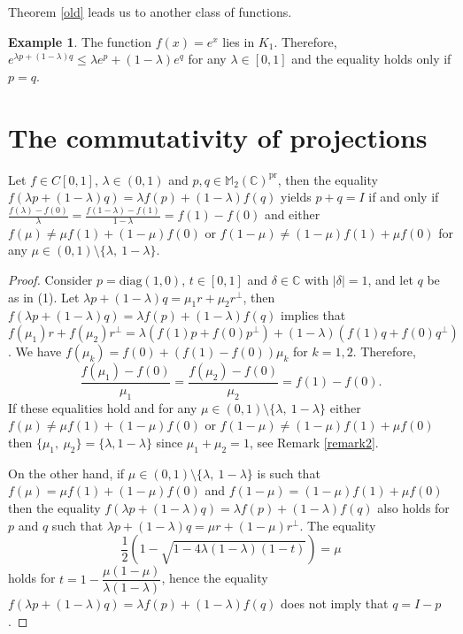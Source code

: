 \documentclass[
11pt,%
tightenlines,%
twoside,%
onecolumn,%
nofloats,%
nobibnotes,%
nofootinbib,%
superscriptaddress,%
noshowpacs,%
centertags]%
{revtex4}
\theoremstyle{definition}
\newtheorem{example}{Example} %
\begin{document}
Theorem \ref{old} leads us to another class of  functions.

\begin{example}
The function $f(x)=e^x$ lies in $K_1$.
  Therefore, $e^{\lambda p +(1-\lambda) q}\leq \lambda e^p +(1-\lambda) e^q$
for any $\lambda\in[0,1]$ and the equality holds only if $p=q$.
\end{example}

\section{The commutativity of projections}

\begin{lemma}\label{2dim2}
Let $f\in C[0,1]$, $\lambda\in (0,1)$ and $p, q\in
\mathbb{M}_2(\mathbb{C})^\mathrm{pr}$,  then the equality $f(\lambda
p +(1-\lambda) q)=\lambda f(p)+(1-\lambda)f(q)$ yields $p+q=I$ if
and only if
$\frac{f(\lambda)-f(0)}{\lambda}=\frac{f(1-\lambda)-f(1)}{1-\lambda}=f(1)-f(0)$
and either $f(\mu)\neq \mu f(1)+(1-\mu)f(0)$ or $f(1-\mu)\neq
(1-\mu) f(1)+\mu f(0)$ for any $\mu\in(0,1)\setminus\{\lambda,\
1-\lambda\}$.

\end{lemma}
\begin{proof}
Consider $p=\mathrm{diag}(1,0)$, $t\in [0,1]$ and $\delta\in
\mathbb{C}$  with $|\delta|=1$, and let $q$ be as in (1). Let
$\lambda p+(1-\lambda)q =\mu_1 r+\mu_2 r^\perp$, then $f(\lambda p
+(1-\lambda) q)=\lambda f(p)+(1-\lambda)f(q)$ implies that
$f(\mu_1)r+f(\mu_2)r^\perp=\lambda
(f(1)p+f(0)p^\perp)+(1-\lambda)(f(1)q+f(0)q^\perp)$. We have
$f(\mu_k)=f(0)+(f(1)-f(0))\mu_k$ for $k=1,2$. Therefore,
$$
\frac{f(\mu_1)-f(0)}{\mu_1}=\frac{f(\mu_2)-f(0)}{\mu_2}=f(1)-f(0).
$$
If these equalities hold and for any
$\mu\in(0,1)\setminus\{\lambda,\ 1-\lambda\}$  either $f(\mu)\neq
\mu f(1)+(1-\mu)f(0)$ or $f(1-\mu)\neq (1-\mu)f(1)+\mu f(0)$ then
$\{\mu_1,\ \mu_2\}=\{\lambda, 1-\lambda\}$ since $\mu_1+\mu_2=1$,
see  Remark \ref{remark2}.

On the other hand, if $\mu\in(0,1)\setminus\{\lambda,\ 1-\lambda\}$
is  such that $f(\mu)= \mu f(1)+(1-\mu)f(0)$ and $f(1-\mu)= (1-\mu)
f(1)+\mu f(0)$ then the equality $f(\lambda p +(1-\lambda)
q)=\lambda f(p)+(1-\lambda)f(q)$ also holds for $p$ and $q$ such
that $\lambda p +(1-\lambda) q =\mu r + (1-\mu)r^\perp$.  The
equality
$$
\frac{1}{2}(1-\sqrt{1-4\lambda(1-\lambda)(1-t)})=\mu
$$
holds for $t=1-\dfrac{\mu(1-\mu)}{\lambda(1-\lambda)}$,
hence
the equality $f(\lambda p +(1-\lambda) q)=\lambda f(p)+(1-\lambda)f(q)$ does not imply that $q=I-p$.
\end{proof}
\end{document}
